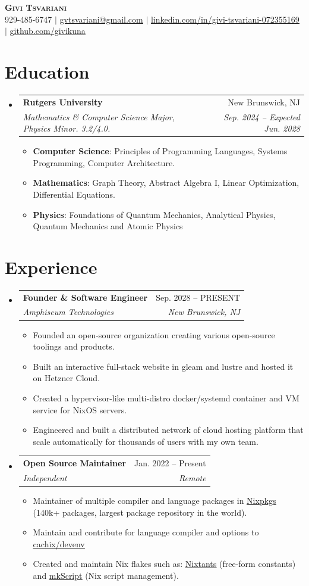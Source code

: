 \documentclass[letterpaper,11pt]{article}
\makeatletter
\newcommand{\resumeItem}[1]{
  \item\small{
    {#1 \vspace{-2pt}}
  }
}
\newcommand{\resumeSubheading}[4]{
  \vspace{-2pt}\item
    \begin{tabular*}{0.97\textwidth}[t]{l@{\extracolsep{\fill}}r}
      \textbf{#1} & #2 \\
      \textit{\small#3} & \textit{\small #4} \\
    \end{tabular*}\vspace{-7pt}
}
\newcommand{\resumeSubHeadingListStart}{\begin{itemize}[leftmargin=0.15in, label={}]}
\newcommand{\resumeSubHeadingListEnd}{\end{itemize}}
\newcommand{\resumeItemListStart}{\begin{itemize}}
\newcommand{\resumeItemListEnd}{\end{itemize}\vspace{-5pt}}
\makeatother
\begin{document}
\begin{center}
    \textbf{\Huge \scshape Givi Tsvariani} \\ \vspace{1pt}
    \small 929-485-6747 $|$ \href{mailto:gvtsvariani@gmail.com}{\underline{gvtsvariani@gmail.com}} $|$ 
    \href{https://linkedin.com/in/givi-tsvariani-072355169}{\underline{linkedin.com/in/givi-tsvariani-072355169}} $|$
    \href{https://github.com/givikuna}{\underline{github.com/givikuna}}
\end{center}

\section{Education}
  \resumeSubHeadingListStart
  \resumeSubheading
  {Rutgers University}{New Brunswick, NJ}
  {Mathematics \& Computer Science Major, Physics Minor. 3.2/4.0.}{Sep. 2024 -- Expected Jun. 2028}
\resumeItemListStart
  \resumeItem{\textbf{Computer Science}: Principles of Programming Languages, Systems Programming, Computer Architecture.}
  \resumeItem{\textbf{Mathematics}: Graph Theory, Abstract Algebra I, Linear Optimization, Differential Equations.}
  \resumeItem{\textbf{Physics}: Foundations of Quantum Mechanics, Analytical Physics, Quantum Mechanics and Atomic Physics}
\resumeItemListEnd
  \resumeSubHeadingListEnd

\section{Experience}
  \resumeSubHeadingListStart
  \resumeSubheading
  {Founder \& Software Engineer}{Sep. 2028 -- PRESENT}
  {Amphiseum Technologies}{New Brunswick, NJ}
\resumeItemListStart
  \resumeItem{Founded an open-source organization creating various open-source toolings and products.}
  \resumeItem{Built an interactive full-stack website in gleam and lustre and hosted it on Hetzner Cloud.}
  \resumeItem{Created a hypervisor-like multi-distro docker/systemd container and VM service for NixOS servers.}
  \resumeItem{Engineered and built a distributed network of cloud hosting platform that scale automatically for thousands of users with my own team.}
\resumeItemListEnd

 \resumeSubheading
  {Open Source Maintainer}{Jan. 2022 -- Present}
  {Independent}{Remote}
\resumeItemListStart
  \resumeItem{Maintainer of multiple compiler and language packages in \href{https://github.com/nixos/nixpkgs}{\underline{Nixpkgs}} (140k+ packages, largest package repository in the world).}
  \resumeItem{Maintain and contribute for language compiler and options to \href{https://github.com/cachix/devenv}{\underline{cachix/devenv}}}
  \resumeItem{Created and maintain Nix flakes such as: \href{https://github.com/givikuna/nixtants}{\underline{Nixtants}} (free-form constants) and \href{https://github.com/givikuna/nix-mkScript}{\underline{mkScript}} (Nix script management).}
\resumeItemListEnd
  \resumeSubHeadingListEnd
\end{document}
